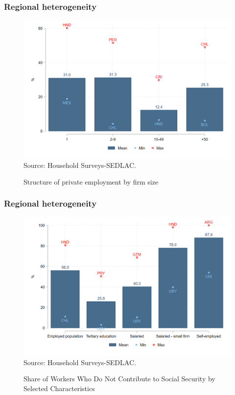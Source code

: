 \documentclass{beamer}
\begin{document}
\begin{frame}
\frametitle{Regional heterogeneity}
\begin{figure}[!htb]
        \justifying
        \caption{Structure of private employment by firm size}     
        \includegraphics[width=0.8\linewidth]{latex/figures/Snapshot/Structure of employment by firm size.png}
        \label{fig:firmsize}
        \centering
        \footnotesize{Source: Household Surveys-SEDLAC.}
        \end{figure}

\end{frame}
\begin{frame}
\frametitle{Regional heterogeneity}
\begin{figure}[!htb]
        \justifying
        \caption{Share of Workers Who Do Not Contribute to Social Security by Selected Characteristics}     
        \includegraphics[width=0.8\linewidth]{latex/figures/Snapshot/Social security contributions.png}
        \label{fig:SScontributions}
        \centering
        \footnotesize{Source: Household Surveys-SEDLAC.}
 \end{figure}
 \end{frame}
\end{document}
